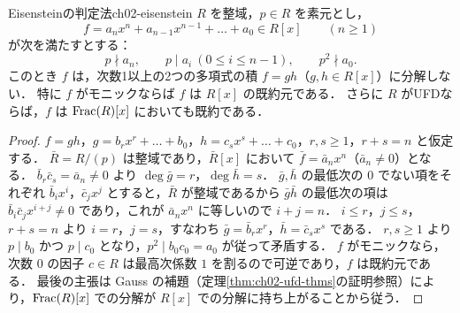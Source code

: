 \begin{mythm}{Eisensteinの判定法}{ch02-eisenstein}
$R$ を整域，$p\in R$ を素元とし，
\[
  f=a_nx^n+a_{n-1}x^{n-1}+\dots+a_0\in R[x]\qquad(n\ge1)
\]
が次を満たすとする：
\[
  p\nmid a_n,\qquad p\mid a_i\ (0\le i\le n-1),\qquad p^2\nmid a_0.
\]
このとき $f$ は，次数1以上の2つの多項式の積 $f=gh$（$g,h\in R[x]$）に分解しない．
特に $f$ がモニックならば $f$ は $R[x]$ の既約元である．
さらに $R$ がUFDならば，$f$ は $\operatorname{Frac}(R)[x]$ においても既約である．
\end{mythm}

\begin{proof}
$f=gh$，$g=b_rx^r+\dots+b_0$，$h=c_sx^s+\dots+c_0$，$r,s\ge1$，$r+s=n$ と仮定する．
$\bar R=R/(p)$ は整域であり，$\bar R[x]$ において $\bar f=\bar a_nx^n$（$\bar a_n\ne0$）となる．
$\bar b_r\bar c_s=\bar a_n\ne0$ より $\deg\bar g=r$，$\deg\bar h=s$．
$\bar g,\bar h$ の最低次の $0$ でない項をそれぞれ $\bar b_ix^i$，$\bar c_jx^j$ とすると，$\bar R$ が整域であるから
$\bar g\bar h$ の最低次の項は $\bar b_i\bar c_jx^{i+j}\ne0$ であり，これが $\bar a_nx^n$ に等しいので $i+j=n$．
$i\le r$，$j\le s$，$r+s=n$ より $i=r$，$j=s$，すなわち $\bar g=\bar b_rx^r$，$\bar h=\bar c_sx^s$ である．
$r,s\ge1$ より $p\mid b_0$ かつ $p\mid c_0$ となり，$p^2\mid b_0c_0=a_0$ が従って矛盾する．
$f$ がモニックなら，次数 $0$ の因子 $c\in R$ は最高次係数 $1$ を割るので可逆であり，$f$ は既約元である．
最後の主張は Gauss の補題（定理\ref{thm:ch02-ufd-thms}の証明参照）により，$\operatorname{Frac}(R)[x]$ での分解が $R[x]$ での分解に持ち上がることから従う．
\end{proof}

